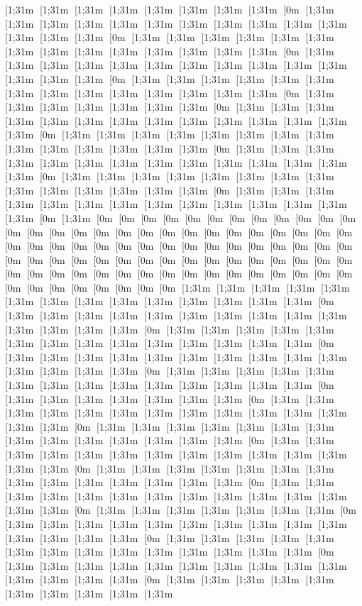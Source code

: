 [1;31m [1;31m [1;31m [1;31m [1;31m [1;31m [1;31m [1;31m [0m [1;31m [1;31m [1;31m [1;31m [1;31m [1;31m [1;31m [1;31m [1;31m [1;31m [1;31m [1;31m [1;31m [1;31m [0m [1;31m [1;31m [1;31m [1;31m [1;31m [1;31m [1;31m [1;31m [1;31m [1;31m [1;31m [1;31m [1;31m [1;31m [0m [1;31m [1;31m [1;31m [1;31m [1;31m [1;31m [1;31m [1;31m [1;31m [1;31m [1;31m [1;31m [1;31m [1;31m [0m [1;31m [1;31m [1;31m [1;31m [1;31m [1;31m [1;31m [1;31m [1;31m [1;31m [1;31m [1;31m [1;31m [1;31m [0m [1;31m [1;31m [1;31m [1;31m [1;31m [1;31m [1;31m [0m [1;31m [1;31m [1;31m [1;31m [1;31m [1;31m [1;31m [1;31m [1;31m [1;31m [1;31m [1;31m [1;31m [1;31m [0m [1;31m [1;31m [1;31m [1;31m [1;31m [1;31m [1;31m [1;31m [1;31m [1;31m [1;31m [1;31m [1;31m [1;31m [0m [1;31m [1;31m [1;31m [1;31m [1;31m [1;31m [1;31m [1;31m [1;31m [1;31m [1;31m [1;31m [1;31m [1;31m [0m [1;31m [1;31m [1;31m [1;31m [1;31m [1;31m [1;31m [1;31m [1;31m [1;31m [1;31m [1;31m [1;31m [1;31m [0m [1;31m [1;31m [1;31m [1;31m [1;31m [1;31m [1;31m [1;31m [1;31m [1;31m [1;31m [1;31m [1;31m [1;31m [0m [1;31m [0m [0m [0m [0m [0m [0m [0m [0m [0m [0m [0m [0m [0m [0m [0m [0m [0m [0m [0m [0m [0m [0m [0m [0m [0m [0m [0m [0m [0m [0m [0m [0m [0m [0m [0m [0m [0m [0m [0m [0m [0m [0m [0m [0m [0m [0m [0m [0m [0m [0m [0m [0m [0m [0m [0m [0m [0m [0m [0m [0m [0m [0m [0m [0m [0m [0m [0m [0m [0m [0m [0m [0m [0m [0m [0m [0m [0m [0m [0m [0m [0m [0m [0m [0m [1;31m [1;31m [1;31m [1;31m [1;31m [1;31m [1;31m [1;31m [1;31m [1;31m [1;31m [1;31m [1;31m [1;31m [0m [1;31m [1;31m [1;31m [1;31m [1;31m [1;31m [1;31m [1;31m [1;31m [1;31m [1;31m [1;31m [1;31m [1;31m [0m [1;31m [1;31m [1;31m [1;31m [1;31m [1;31m [1;31m [1;31m [1;31m [1;31m [1;31m [1;31m [1;31m [1;31m [0m [1;31m [1;31m [1;31m [1;31m [1;31m [1;31m [1;31m [1;31m [1;31m [1;31m [1;31m [1;31m [1;31m [1;31m [0m [1;31m [1;31m [1;31m [1;31m [1;31m [1;31m [1;31m [1;31m [1;31m [1;31m [1;31m [1;31m [1;31m [1;31m [0m [1;31m [1;31m [1;31m [1;31m [1;31m [1;31m [1;31m [0m [1;31m [1;31m [1;31m [1;31m [1;31m [1;31m [1;31m [1;31m [1;31m [1;31m [1;31m [1;31m [1;31m [1;31m [0m [1;31m [1;31m [1;31m [1;31m [1;31m [1;31m [1;31m [1;31m [1;31m [1;31m [1;31m [1;31m [1;31m [1;31m [0m [1;31m [1;31m [1;31m [1;31m [1;31m [1;31m [1;31m [1;31m [1;31m [1;31m [1;31m [1;31m [1;31m [1;31m [0m [1;31m [1;31m [1;31m [1;31m [1;31m [1;31m [1;31m [1;31m [1;31m [1;31m [1;31m [1;31m [1;31m [1;31m [0m [1;31m [1;31m [1;31m [1;31m [1;31m [1;31m [1;31m [1;31m [1;31m [1;31m [1;31m [1;31m [1;31m [1;31m [0m [1;31m [1;31m [1;31m [1;31m [1;31m [1;31m [1;31m [0m [1;31m [1;31m [1;31m [1;31m [1;31m [1;31m [1;31m [1;31m [1;31m [1;31m [1;31m [1;31m [1;31m [1;31m [0m [1;31m [1;31m [1;31m [1;31m [1;31m [1;31m [1;31m [1;31m [1;31m [1;31m [1;31m [1;31m [1;31m [1;31m [0m [1;31m [1;31m [1;31m [1;31m [1;31m [1;31m [1;31m [1;31m [1;31m [1;31m [1;31m [1;31m [1;31m [1;31m [0m [1;31m [1;31m [1;31m [1;31m [1;31m [1;31m [1;31m [1;31m [1;31m [1;31m 